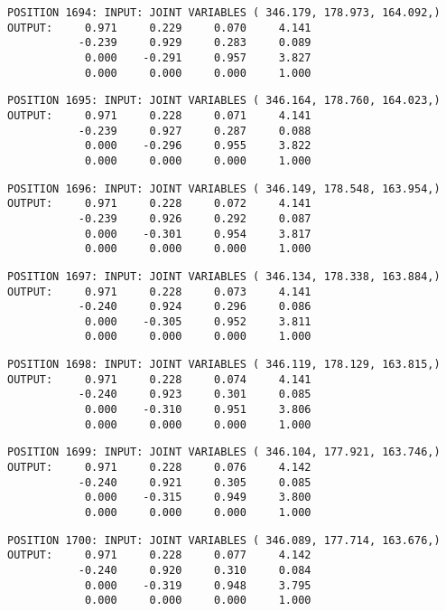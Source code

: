 \begin{verbatim}
POSITION 1694: INPUT: JOINT VARIABLES ( 346.179, 178.973, 164.092,)
OUTPUT:     0.971     0.229     0.070     4.141
           -0.239     0.929     0.283     0.089
            0.000    -0.291     0.957     3.827
            0.000     0.000     0.000     1.000
\end{verbatim} \pagebreak[1]\begin{verbatim}
POSITION 1695: INPUT: JOINT VARIABLES ( 346.164, 178.760, 164.023,)
OUTPUT:     0.971     0.228     0.071     4.141
           -0.239     0.927     0.287     0.088
            0.000    -0.296     0.955     3.822
            0.000     0.000     0.000     1.000
\end{verbatim} \pagebreak[1]\begin{verbatim}
POSITION 1696: INPUT: JOINT VARIABLES ( 346.149, 178.548, 163.954,)
OUTPUT:     0.971     0.228     0.072     4.141
           -0.239     0.926     0.292     0.087
            0.000    -0.301     0.954     3.817
            0.000     0.000     0.000     1.000
\end{verbatim} \pagebreak[1]\begin{verbatim}
POSITION 1697: INPUT: JOINT VARIABLES ( 346.134, 178.338, 163.884,)
OUTPUT:     0.971     0.228     0.073     4.141
           -0.240     0.924     0.296     0.086
            0.000    -0.305     0.952     3.811
            0.000     0.000     0.000     1.000
\end{verbatim} \pagebreak[1]\begin{verbatim}
POSITION 1698: INPUT: JOINT VARIABLES ( 346.119, 178.129, 163.815,)
OUTPUT:     0.971     0.228     0.074     4.141
           -0.240     0.923     0.301     0.085
            0.000    -0.310     0.951     3.806
            0.000     0.000     0.000     1.000
\end{verbatim} \pagebreak[1]\begin{verbatim}
POSITION 1699: INPUT: JOINT VARIABLES ( 346.104, 177.921, 163.746,)
OUTPUT:     0.971     0.228     0.076     4.142
           -0.240     0.921     0.305     0.085
            0.000    -0.315     0.949     3.800
            0.000     0.000     0.000     1.000
\end{verbatim} \pagebreak[1]\begin{verbatim}
POSITION 1700: INPUT: JOINT VARIABLES ( 346.089, 177.714, 163.676,)
OUTPUT:     0.971     0.228     0.077     4.142
           -0.240     0.920     0.310     0.084
            0.000    -0.319     0.948     3.795
            0.000     0.000     0.000     1.000
\end{verbatim} \pagebreak[1]\begin{verbatim}

\end{verbatim}
